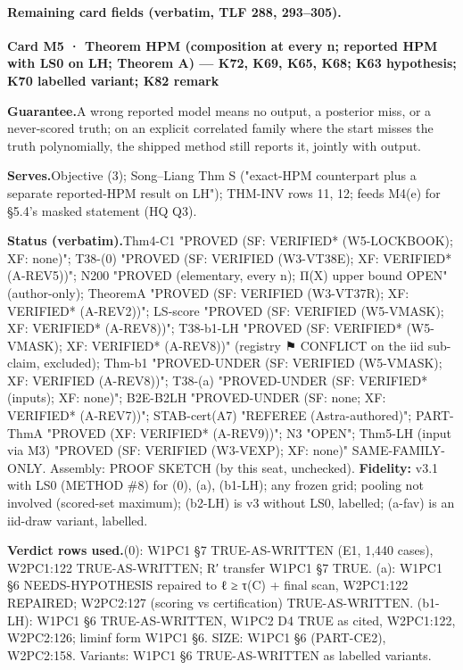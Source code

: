 \paragraph{Remaining card fields (verbatim, TLF 288, 293–305).}
{\small
\par\smallskip\noindent\textbf{Card M5 · Theorem HPM (composition at every n; reported HPM with LS0 on LH; Theorem A) — K72, K69, K65, K68; K63 hypothesis; K70 labelled variant; K82 remark}
\par\smallskip\noindent\textbf{Guarantee.}\enspace A wrong reported model means no output, a posterior miss, or a never-scored truth; on an explicit correlated family where the start misses the truth polynomially, the shipped method still reports it, jointly with output.
\par\smallskip\noindent\textbf{Serves.}\enspace Objective (3); Song–Liang Thm S ("exact-HPM counterpart plus a separate reported-HPM result on LH"); THM-INV rows 11, 12; feeds M4(e) for §5.4's masked statement (HQ Q3).
\par\smallskip\noindent\textbf{Status (verbatim).}\enspace Thm4-C1 "PROVED (SF: VERIFIED* (W5-LOCKBOOK); XF: none)"; T38-(0) "PROVED (SF: VERIFIED (W3-VT38E); XF: VERIFIED* (A-REV5))"; N200 "PROVED (elementary, every n); Π(X) upper bound OPEN" (author-only); TheoremA "PROVED (SF: VERIFIED (W3-VT37R); XF: VERIFIED* (A-REV2))"; LS-score "PROVED (SF: VERIFIED (W5-VMASK); XF: VERIFIED* (A-REV8))"; T38-b1-LH "PROVED (SF: VERIFIED* (W5-VMASK); XF: VERIFIED* (A-REV8))" (registry ⚑ CONFLICT on the iid sub-claim, excluded); Thm-b1 "PROVED-UNDER (SF: VERIFIED (W5-VMASK); XF: VERIFIED (A-REV8))"; T38-(a) "PROVED-UNDER (SF: VERIFIED* (inputs); XF: none)"; B2E-B2LH "PROVED-UNDER (SF: none; XF: VERIFIED* (A-REV7))"; STAB-cert(A7) "REFEREE (Astra-authored)"; PART-ThmA "PROVED (XF: VERIFIED* (A-REV9))"; N3 "OPEN"; Thm5-LH (input via M3) "PROVED (SF: VERIFIED (W3-VEXP); XF: none)" SAME-FAMILY-ONLY. Assembly: PROOF SKETCH (by this seat, unchecked). \textbf{Fidelity:} v3.1 with LS0 (METHOD \#8) for (0), (a), (b1-LH); any frozen grid; pooling not involved (scored-set maximum); (b2-LH) is v3 without LS0, labelled; (a-fav) is an iid-draw variant, labelled.
\par\smallskip\noindent\textbf{Verdict rows used.}\enspace (0): W1PC1 §7 TRUE-AS-WRITTEN (E1, 1,440 cases), W2PC1:122 TRUE-AS-WRITTEN; R′ transfer W1PC1 §7 TRUE. (a): W1PC1 §6 NEEDS-HYPOTHESIS repaired to ℓ ≥ τ(C) + final scan, W2PC1:122 REPAIRED; W2PC2:127 (scoring vs certification) TRUE-AS-WRITTEN. (b1-LH): W1PC1 §6 TRUE-AS-WRITTEN, W1PC2 D4 TRUE as cited, W2PC1:122, W2PC2:126; liminf form W1PC1 §6. SIZE: W1PC1 §6 (PART-CE2), W2PC2:158. Variants: W1PC1 §6 TRUE-AS-WRITTEN as labelled variants.
}

